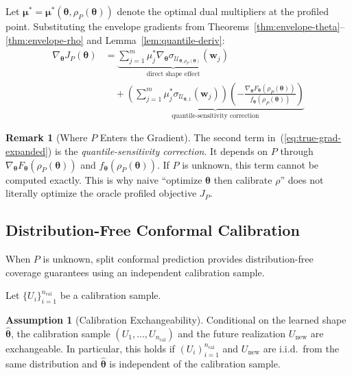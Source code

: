 \documentclass[lettersize,journal]{IEEEtran}
\newcommand{\cU}{\mathcal{U}}
\newcommand{\btheta}{\bm{\theta}}
\newcommand{\bmu}{\bm{\mu}}
\newcommand{\bw}{\bm{w}}
\theoremstyle{definition}
\newtheorem{assumption}{Assumption}
\newtheorem{remark}{Remark}
\begin{document}
Let $\bmu^* = \bmu^*(\btheta, \rho_P(\btheta))$ denote the optimal dual multipliers at the profiled point. Substituting the envelope gradients from Theorems~\ref{thm:envelope-theta}--\ref{thm:envelope-rho} and Lemma~\ref{lem:quantile-deriv}:
\begin{equation}\label{eq:true-grad-expanded}
\boxed{
\begin{aligned}
\nabla_{\btheta} J_P(\btheta) &= \underbrace{\sum_{j=1}^m \mu_j^* \nabla_{\btheta} \sigma_{\cU_{\btheta,\rho_P(\btheta)}}(\bw_j)}_{\text{direct shape effect}} \\
&\quad + \underbrace{\left(\sum_{j=1}^m \mu_j^* \sigma_{\cU_{\btheta,1}}(\bw_j)\right) \left(-\frac{\nabla_{\btheta} F_{\btheta}(\rho_P(\btheta))}{f_{\btheta}(\rho_P(\btheta))}\right)}_{\text{quantile-sensitivity correction}}
\end{aligned}
}
\end{equation}

\begin{remark}[Where $P$ Enters the Gradient]
The second term in~(\ref{eq:true-grad-expanded}) is the \emph{quantile-sensitivity correction}. It depends on $P$ through $\nabla_{\btheta} F_{\btheta}(\rho_P(\btheta))$ and $f_{\btheta}(\rho_P(\btheta))$. If $P$ is unknown, this term cannot be computed exactly. This is why naive ``optimize $\btheta$ then calibrate $\rho$'' does not literally optimize the oracle profiled objective $J_P$.
\end{remark}

\subsection{Distribution-Free Conformal Calibration}

When $P$ is unknown, split conformal prediction provides distribution-free coverage guarantees using an independent calibration sample.

Let $\{U_i\}_{i=1}^{n_{\text{cal}}}$ be a calibration sample.

\begin{assumption}[Calibration Exchangeability]\label{asm:exchange}
Conditional on the learned shape $\hat{\btheta}$, the calibration sample
$(U_1,\ldots,U_{n_{\mathrm{cal}}})$ and the future realization $U_{\mathrm{new}}$ are exchangeable.
In particular, this holds if $(U_i)_{i=1}^{n_{\mathrm{cal}}}$ and $U_{\mathrm{new}}$ are i.i.d.\ from the same distribution
and $\hat{\btheta}$ is independent of the calibration sample.
\end{assumption}
\end{document}
